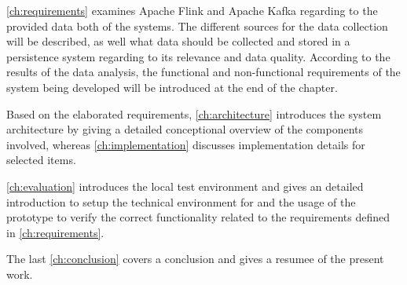 \autoref{ch:requirements} examines Apache Flink and Apache Kafka regarding to the provided data
both of the systems. The different sources for the data collection will be described, as
well what data should be collected and stored in a persistence system regarding to its
relevance and data quality. According to the results of the data analysis, the functional
and non-functional requirements of the system being developed will be introduced at the
end of the chapter.

Based on the elaborated requirements, \autoref{ch:architecture} introduces the system architecture by
giving a detailed conceptional overview of the components involved, whereas \autoref{ch:implementation}
discusses implementation details for selected items.

\autoref{ch:evaluation} introduces the local test environment and gives an detailed introduction to setup
the technical environment for and the usage of the prototype to verify the correct functionality
related to the requirements defined in \autoref{ch:requirements}.

The last \autoref{ch:conclusion} covers a conclusion and gives a resumee of the present work.